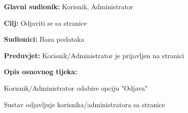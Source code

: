 					\noindent {}
					\begin{packed_item}
	\item \textbf{Glavni sudionik:} Korisnik, Administrator
	\item  \textbf{Cilj:} Odjaviti se sa stranice
	\item  \textbf{Sudionici:} Baza podataka
	\item  \textbf{Preduvjet:} Korisnik/Administrator je prijavljen na stranici
	\item  \textbf{Opis osnovnog tijeka:}
	
	\item[] \begin{packed_enum}
		
		\item Korisnik/Administrator odabire opciju "Odjava"
		\item Sustav odjavljuje korisnika/administratora sa stranice
	\end{packed_enum}

\end{packed_item}

